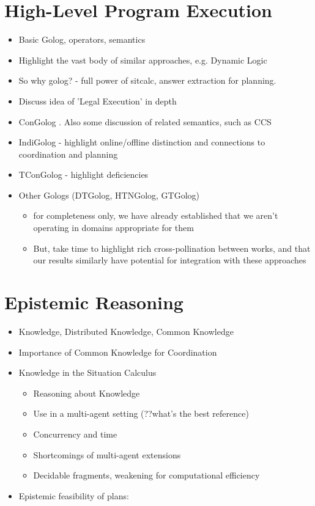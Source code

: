 \section{High-Level Program Execution}

\begin{itemize}
\item Basic Golog, operators, semantics \cite{levesque97golog} 
\item Highlight the vast body of similar approaches, e.g. Dynamic Logic 
\item So why golog? - full power of sitcalc, answer extraction for planning. 
\item Discuss idea of 'Legal Execution' in depth 
\item ConGolog \cite{giacomo00congolog}. Also some discussion of related
semantics, such as CCS 
\item IndiGolog - highlight online/offline distinction and connections to
coordination and planning \cite{giacomo99indigolog} 
\item TConGolog - highlight deficiencies \cite{pinto99tcongolog} 
\item Other Gologs (DTGolog, HTNGolog, GTGolog) 

\begin{itemize}
\item for completeness only, we have already established that we aren't
operating in domains appropriate for them 
\item But, take time to highlight rich cross-pollination between works,
and that our results similarly have potential for integration with
these approaches 
\end{itemize}
\end{itemize}

\section{Epistemic Reasoning}

\begin{itemize}
\item Knowledge, Distributed Knowledge, Common Knowledge \cite{halpern90knowledge_distrib,fagin95} 
\item Importance of Common Knowledge for Coordination 
\item Knowledge in the Situation Calculus 

\begin{itemize}
\item Reasoning about Knowledge \cite{moore80know_act,scherl03sc_knowledge} 
\item Use in a multi-agent setting (??what's the best reference) 
\item Concurrency and time \cite{scherl03conc_knowledge} 
\item Shortcomings of multi-agent extensions 
\item Decidable fragments, weakening for computational efficiency 
\end{itemize}
\item Epistemic feasibility of plans: \cite{giacomo04sem_delib_indigolog,Lesperance01epi_feas_casl} 
\end{itemize}

